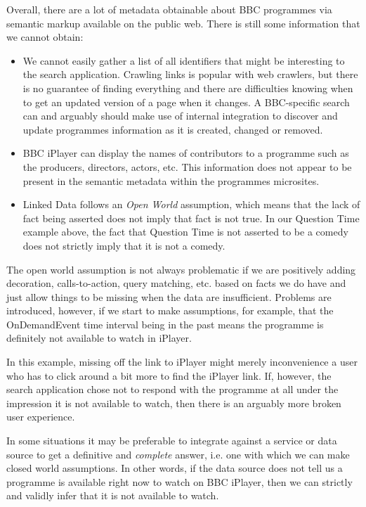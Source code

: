 Overall, there are a lot of metadata obtainable about BBC
programmes via semantic markup available on the public web. There is
still some information that we cannot obtain:

\begin{itemize}
  \item We cannot easily gather a list of all identifiers that might
    be interesting to the search application. Crawling links is
    popular with web crawlers, but there is no guarantee of finding
    everything and there are difficulties knowing when to get an
    updated version of a page when it changes. A BBC-specific
    search can and arguably should make use of internal integration
    to discover and update programmes information as it is created,
    changed or removed.
  \item BBC iPlayer can display the names of contributors to a programme
    such as the producers, directors, actors, etc. This information
    does not appear to be present in the semantic metadata within
    the programmes microsites.
  \item Linked Data follows an \emph{Open World} assumption,
    which means that the lack of fact being asserted does not imply
    that fact is not true. In our Question Time example above, the
    fact that Question Time is not asserted to be a comedy does not
    strictly imply that it is not a comedy.
\end{itemize}


The open world assumption is not always problematic
if we are positively adding
decoration, calls-to-action, query matching, etc. based on
facts we do have and just allow things to be missing when
the data are insufficient. Problems are introduced, however,
if we start to make assumptions, for example, that the
OnDemandEvent time interval being in the past means the
programme is definitely not available to watch in iPlayer.

In this example, missing off the link to iPlayer might merely
inconvenience a user who has to click around a bit more to
find the iPlayer link. If, however, the search application
chose not to respond with the programme at all under the
impression it is not available to watch, then there is an
arguably more broken user experience.

In some situations it may be preferable to integrate against
a service or data source to get a definitive and \emph{complete}
answer, i.e. one with which we can make closed world assumptions.
In other words, if the data source does not tell us a programme
is available right now to watch on BBC iPlayer, then we can
strictly and validly infer that it is not available to watch.

